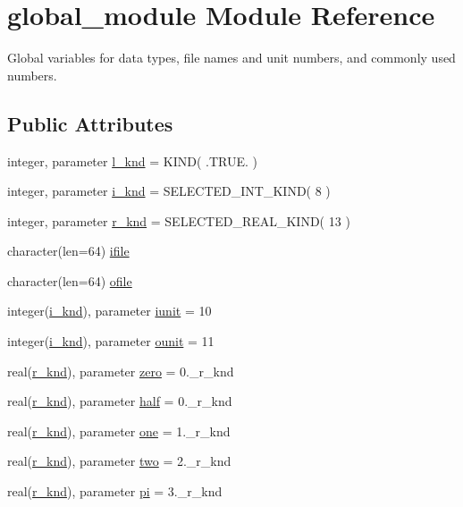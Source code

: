 \hypertarget{classglobal__module}{\section{global\-\_\-module Module Reference}
\label{classglobal__module}
}


Global variables for data types, file names and unit numbers, and commonly used numbers.  


\subsection*{Public Attributes}
\begin{DoxyCompactItemize}
\item 
integer, parameter \hyperlink{classglobal__module_a968ba1aa6e3f1767b59bfb8bd310405e}{l\-\_\-knd} = K\-I\-N\-D( .T\-R\-U\-E. )
\item 
integer, parameter \hyperlink{classglobal__module_a01b861666154d8b3e5bd725ae8933438}{i\-\_\-knd} = S\-E\-L\-E\-C\-T\-E\-D\-\_\-\-I\-N\-T\-\_\-\-K\-I\-N\-D( 8 )
\item 
integer, parameter \hyperlink{classglobal__module_ab88bc58495adcaa0c39aac0c541fe8c8}{r\-\_\-knd} = S\-E\-L\-E\-C\-T\-E\-D\-\_\-\-R\-E\-A\-L\-\_\-\-K\-I\-N\-D( 13 )
\item 
character(len=64) \hyperlink{classglobal__module_a1da218815b0b537a80f4792dfb22db36}{ifile}
\item 
character(len=64) \hyperlink{classglobal__module_af73eb645949440d8b32d555f3693d9bf}{ofile}
\item 
integer(\hyperlink{classglobal__module_a01b861666154d8b3e5bd725ae8933438}{i\-\_\-knd}), parameter \hyperlink{classglobal__module_a734e710669b353233ba6b431d2b10a60}{iunit} = 10
\item 
integer(\hyperlink{classglobal__module_a01b861666154d8b3e5bd725ae8933438}{i\-\_\-knd}), parameter \hyperlink{classglobal__module_a3d8941f8c329162cde48206e253955f5}{ounit} = 11
\item 
real(\hyperlink{classglobal__module_ab88bc58495adcaa0c39aac0c541fe8c8}{r\-\_\-knd}), parameter \hyperlink{classglobal__module_aee835b3a70993d265b7592f2485da98a}{zero} = 0.\-\_\-r\-\_\-knd
\item 
real(\hyperlink{classglobal__module_ab88bc58495adcaa0c39aac0c541fe8c8}{r\-\_\-knd}), parameter \hyperlink{classglobal__module_aca3045154e42c1413c7e40cff43d609b}{half} = 0.\-\_\-r\-\_\-knd
\item 
real(\hyperlink{classglobal__module_ab88bc58495adcaa0c39aac0c541fe8c8}{r\-\_\-knd}), parameter \hyperlink{classglobal__module_ad2273c99f1e5fd95558f9217ed48f65f}{one} = 1.\-\_\-r\-\_\-knd
\item 
real(\hyperlink{classglobal__module_ab88bc58495adcaa0c39aac0c541fe8c8}{r\-\_\-knd}), parameter \hyperlink{classglobal__module_ae882a53fa5147b5a17b1de231a9edc1e}{two} = 2.\-\_\-r\-\_\-knd
\item 
real(\hyperlink{classglobal__module_ab88bc58495adcaa0c39aac0c541fe8c8}{r\-\_\-knd}), parameter \hyperlink{classglobal__module_ac248f55c9fa522378b386ab9456aec4e}{pi} = 3.\-\_\-r\-\_\-knd
\end{DoxyCompactItemize}


